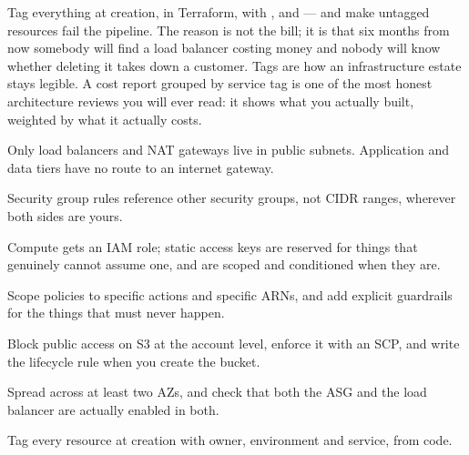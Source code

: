 \begin{seniornote}
Tag everything at creation, in Terraform, with ,  and  --- and make untagged resources fail the pipeline. The reason is not the bill; it is that six months from now somebody will find a load balancer costing money and nobody will know whether deleting it takes down a customer. Tags are how an infrastructure estate stays legible. A cost report grouped by service tag is one of the most honest architecture reviews you will ever read: it shows what you actually built, weighted by what it actually costs.
\end{seniornote}

\begin{bestpractices}
\begin{wbitem}
  \item Only load balancers and NAT gateways live in public subnets. Application and data tiers have no  route to an internet gateway.
  \item Security group rules reference other security groups, not CIDR ranges, wherever both sides are yours.
  \item Compute gets an IAM role; static access keys are reserved for things that genuinely cannot assume one, and are scoped and conditioned when they are.
  \item Scope policies to specific actions and specific ARNs, and add explicit  guardrails for the things that must never happen.
  \item Block public access on S3 at the account level, enforce it with an SCP, and write the lifecycle rule when you create the bucket.
  \item Spread across at least two AZs, and check that both the ASG and the load balancer are actually enabled in both.
  \item Tag every resource at creation with owner, environment and service, from code.
\end{wbitem}
\end{bestpractices}
